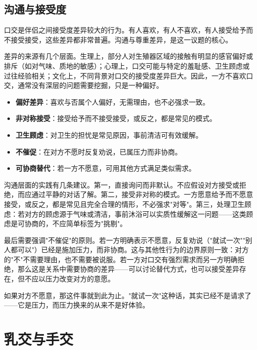 \documentclass[12pt,UTF8]{ctexbook}
\newcommand{\keyword}[1]{\textbf{#1}}
\begin{document}
\subsection{沟通与接受度}

口交是伴侣之间接受度差异较大的行为。有人喜欢，有人不喜欢，有人接受给予而不接受接受，这些差异都非常普遍。沟通与尊重差异，是这一议题的核心。

差异的来源有几个层面。生理上，部分人对生殖器区域的接触有明显的感官偏好或排斥（如对气味、质地的敏感）；心理上，口交可能与特定的羞耻感、卫生顾虑或过往经验相关；文化上，不同背景对口交的接受度差异巨大。因此，一方不喜欢口交，通常没有深层的问题需要挖掘，只是一种偏好。

\begin{itemize}
	\item \keyword{偏好差异}：喜欢与否属个人偏好，无需理由，也不必强求一致。
	\item \keyword{非对称接受}：接受给予而不接受接受，或反之，都是常见的模式。
	\item \keyword{卫生顾虑}：对卫生的担忧是常见原因，事前清洁可有效缓解。
	\item \keyword{不催促}：在对方不愿时反复劝说，已属压力而非协商。
	\item \keyword{可协商替代}：若一方不愿意，可用其他方式满足类似需求。
\end{itemize}

沟通层面的实践有几条建议。第一，直接询问而非默认。不应假设对方接受或拒绝，而应通过平静的对话了解。第二，接受非对称的模式。一方愿意给予而不愿意接受，或反之，都是常见且完全合理的情形，不必强求"对等"。第三，处理卫生顾虑：若对方的顾虑源于气味或清洁，事前沐浴可以实质性缓解这一问题——这类顾虑是可协商的，不应简单标签为"挑剔"。

最后需要强调"不催促"的原则。若一方明确表示不愿意，反复劝说（"就试一次""别人都可以"）已经是施加压力，而非协商。这与其他性行为的边界原则一致：对方的"不"不需要理由，也不需要被说服。若一方对口交有强烈需求而另一方明确拒绝，那么这是关系中需要协商的差异——可以讨论替代方式，也可以接受差异存在，但不应以压力改变对方的意愿。

\begin{tcolorbox}[colback=pink!5!white,colframe=red!50!black,title=贴心小叮咛]
	如果对方不愿意，那这件事就到此为止。"就试一次"这种话，其实已经不是请求了——它是压力，而压力换来的从来不是好体验。
\end{tcolorbox}

\section{乳交与手交}
\end{document}
